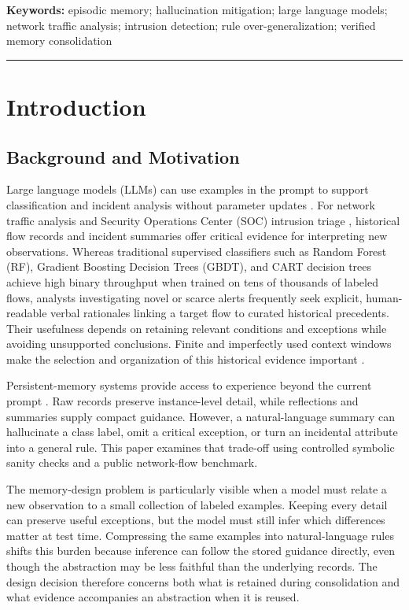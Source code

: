\documentclass[10pt,a4paper,onecolumn]{article}
\theoremstyle{definition}
\theoremstyle{remark}
\begin{document}
\vspace{0.4em}
\noindent\textbf{Keywords:} episodic memory; hallucination mitigation; large language models; network traffic analysis; intrusion detection; rule over-generalization; verified memory consolidation
\vspace{0.6em}
\hrule
\vspace{1.0em}

\section{Introduction}
\subsection{Background and Motivation}
Large language models (LLMs) can use examples in the prompt to support classification and incident analysis without parameter updates \cite{brown2020language,lewis2020retrieval}. For network traffic analysis and Security Operations Center (SOC) intrusion triage \cite{lin2022etbert,sharafaldin2018cicids,houssel2024explainable,islam2026maids}, historical flow records and incident summaries offer critical evidence for interpreting new observations. Whereas traditional supervised classifiers such as Random Forest (RF), Gradient Boosting Decision Trees (GBDT), and CART decision trees achieve high binary throughput when trained on tens of thousands of labeled flows, analysts investigating novel or scarce alerts frequently seek explicit, human-readable verbal rationales linking a target flow to curated historical precedents. Their usefulness depends on retaining relevant conditions and exceptions while avoiding unsupported conclusions. Finite and imperfectly used context windows make the selection and organization of this historical evidence important \cite{an2024why,liu2024lost}.

Persistent-memory systems provide access to experience beyond the current prompt \cite{packer2023memgpt,wang2023longmem,wang2024memoryllm,gutierrez2024hipporag,maharana2024evaluating}. Raw records preserve instance-level detail, while reflections and summaries supply compact guidance. However, a natural-language summary can hallucinate a class label, omit a critical exception, or turn an incidental attribute into a general rule. This paper examines that trade-off using controlled symbolic sanity checks and a public network-flow benchmark.

The memory-design problem is particularly visible when a model must relate a new observation to a small collection of labeled examples. Keeping every detail can preserve useful exceptions, but the model must still infer which differences matter at test time. Compressing the same examples into natural-language rules shifts this burden because inference can follow the stored guidance directly, even though the abstraction may be less faithful than the underlying records. The design decision therefore concerns both what is retained during consolidation and what evidence accompanies an abstraction when it is reused.
\end{document}
